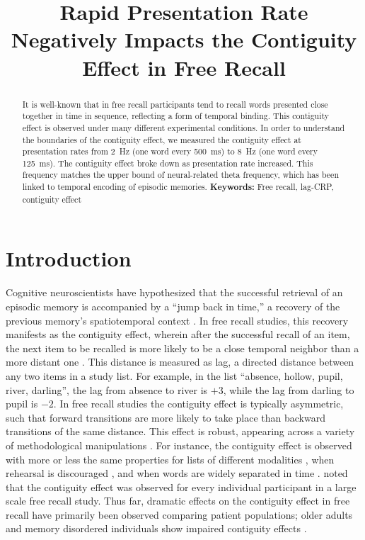 \documentclass[10pt,letterpaper]{article}
\title{Rapid Presentation Rate Negatively Impacts the Contiguity Effect in Free Recall}
\author{{\large \bf Claudio Toro-Serey (ctoro@bu.edu) \and Ian M. Bright (imbright@bu.edu)} \\
  Department of Psychological and Brain Sciences, 64 Cummington Mall\\
  Boston, MA 02215 USA
  \AND
    {\large \bf Brad Wyble (bpw10@psu.edu)} \\
  Department of Psychology, 140 Moore Building\\
  University Park, PA 16801 USA
  \AND
  {\large \bf Marc W. Howard (marc777@bu.edu)} \\
  Department of Psychological and Brain Sciences, 64 Cummington Mall\\
  Boston, MA 02215 USA}
\begin{document}
\maketitle

\begin{abstract}
It is well-known that  in free recall participants tend to recall  
words presented close together in time in sequence, reflecting a form of
temporal binding.
This  contiguity effect is observed under many different experimental
conditions.  In order to understand the boundaries of the contiguity effect,
we measured the contiguity effect at presentation rates from
2~Hz (one word every 500~ms) to 8~Hz (one word every 125~ms). The contiguity
effect broke down as presentation rate increased.  This frequency matches the
upper bound of neural-related theta frequency, which has been linked to
temporal encoding of episodic memories. 
\textbf{Keywords:} 
Free recall, lag-CRP, contiguity effect 
\end{abstract}

\section{Introduction}

Cognitive neuroscientists have hypothesized that the successful retrieval of
an episodic memory is accompanied by a ``jump back in time,'' a recovery of
the previous memory's spatiotemporal context \cite{Tulv83}. In free recall
studies, this recovery manifests as the contiguity effect, wherein after the
successful recall of an item, the next item to be recalled is more likely to
be a close temporal neighbor than a more distant one \cite{Kaha96}. 
This distance is measured as lag, a directed distance between any two items in
a study list. For example, in the list ``absence, hollow, pupil, river,
darling'', the lag from absence to river is $+3$, while the lag from darling to
pupil is $-2$.  
In free recall studies the contiguity effect is typically asymmetric, such that
forward transitions are more likely to take place than backward transitions of
the same distance.  This effect is robust, appearing across a variety of
methodological manipulations \cite{Kaha12,HealKaha14}. 
For instance, the contiguity effect is observed with more or less the same
properties for lists of different modalities \cite{Kaha96}, when rehearsal is
discouraged \cite{HowaKaha99}, and when words are widely separated in time
\cite{HowaEtal08,Unsw08}.   noted that the contiguity effect
was observed for every individual participant in a large scale free recall
study.   Thus far, dramatic effects on the contiguity effect in free recall
have primarily been observed comparing patient populations; older adults and
memory disordered individuals show impaired contiguity effects
\cite{KahaEtal02,PaloEtal19}.
\end{document}
